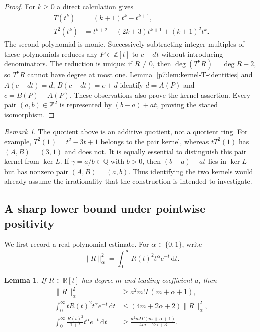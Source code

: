 \documentclass[11pt,a4paper]{article}
\newtheorem{lemma}[theorem]{Lemma}
\theoremstyle{definition}
\theoremstyle{remark}
\newtheorem{remark}[theorem]{Remark}
\newcommand{\Q}{\mathbb Q}
\newcommand{\Z}{\mathbb Z}
\newcommand{\dd}{\,\mathrm d}
\numberwithin{equation}{section}
\begin{document}
\begin{proof}
For $k\geq0$ a direct calculation gives
\begin{align*}
 T(t^k)&=(k+1)t^k-t^{k+1},\\
 T^2(t^k)&=t^{k+2}-(2k+3)t^{k+1}+(k+1)^2t^k.
\end{align*}
The second polynomial is monic.  Successively subtracting integer
multiples of these polynomials reduces any $P\in\Z[t]$ to $c+dt$ without
introducing denominators.  The reduction is unique: if $R\ne0$, then
$\deg(T^2R)=\deg R+2$, so $T^2R$ cannot have degree at most one.
Lemma~\ref{p7:lem:kernel-T-identities} and
$A(c+dt)=d$, $B(c+dt)=c+d$ identify $d=A(P)$ and $c=B(P)-A(P)$.
These observations also prove the kernel assertion.  Every pair
$(a,b)\in\Z^2$ is represented by $(b-a)+at$, proving the stated
isomorphism.
\end{proof}

\begin{remark}\label{p7:rem:kernel-not-scalar}
The quotient above is an additive quotient, not a quotient ring.
For example, $T^2(1)=t^2-3t+1$ belongs to the pair kernel, whereas
$tT^2(1)$ has $(A,B)=(3,1)$ and does not.
It is equally essential to distinguish this pair kernel from
$\ker L$.  If $\gamma=a/b\in\Q$ with $b>0$, then
$(b-a)+at$ lies in $\ker L$ but has nonzero pair $(A,B)=(a,b)$.
Thus identifying the two kernels would already assume the irrationality
that the construction is intended to investigate.
\end{remark}

\subsection{A sharp lower bound under pointwise positivity}

We first record a real-polynomial estimate.  For $\alpha\in\{0,1\}$,
write
\[
 \|R\|_\alpha^2=
 \int_0^\infty R(t)^2t^\alpha e^{-t}\dd t.
\]

\begin{lemma}\label{p7:lem:kernel-laguerre-estimate}
If $R\in\mathbb R[t]$ has degree $m$ and leading coefficient $a$, then
\begin{align}
 \|R\|_\alpha^2&\geq a^2m!\Gamma(m+\alpha+1),\label{p7:eq:kernel-monic-norm}\\
 \int_0^\infty tR(t)^2t^\alpha e^{-t}\dd t
 &\leq(4m+2\alpha+2)\|R\|_\alpha^2,\label{p7:eq:kernel-multiplication-bound}\\
 \int_0^\infty\frac{R(t)^2}{1+t}t^\alpha e^{-t}\dd t
 &\geq\frac{a^2m!\Gamma(m+\alpha+1)}{4m+2\alpha+3}.
 \label{p7:eq:kernel-rational-norm}
\end{align}
\end{lemma}
\end{document}
